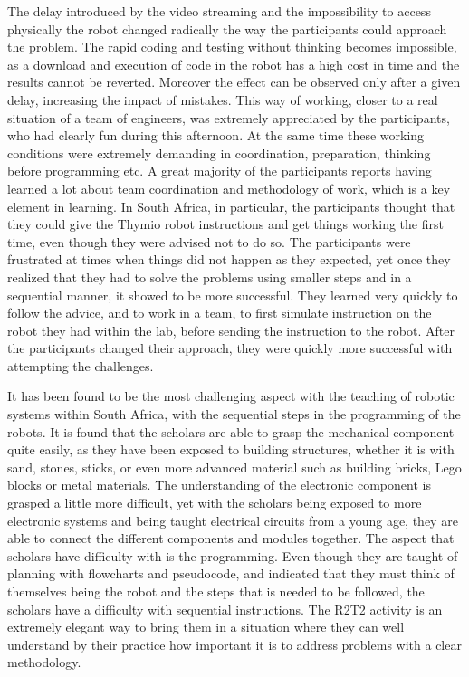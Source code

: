 \documentclass{intech-journal}
\begin{document}
The delay introduced by the video streaming and the impossibility to access physically the robot changed radically the way the participants could approach the problem.
The rapid coding and testing without thinking becomes impossible, as a download and execution of code in the robot has a high cost in time and the results cannot be reverted. 
Moreover the effect can be observed only after a given delay, increasing the impact of mistakes.
This way of working, closer to a real situation of a team of engineers, was extremely appreciated by the participants, who had clearly fun during this afternoon.
At the same time these working conditions were extremely demanding in coordination, preparation, thinking before programming etc. 
A great majority of the participants reports having learned a lot about team coordination and methodology of work, which is a key element in learning.
In South Africa, in particular, the participants thought that they could give the Thymio robot instructions and get things working the first time, even though they were advised not to do so. 
The participants were frustrated at times when things did not happen as they expected, yet once they realized that they had to solve the problems using smaller steps and in a sequential manner, it showed to be more successful. 
They learned very quickly to follow the advice, and to work in a team, to first simulate instruction on the robot they had within the lab, before sending the instruction to the robot.
After the participants changed their approach, they were quickly more successful with attempting the challenges. 

It has been found to be the most challenging aspect with the teaching of robotic systems within South Africa, with the sequential steps in the programming of the robots. 
It is found that the scholars are able to grasp the mechanical component quite easily, as they have been exposed to building structures, whether it is with sand, stones, sticks, or even more advanced material such as building bricks, Lego blocks or metal materials. 
The understanding of the electronic component is grasped a little more difficult, yet with the scholars being exposed to more electronic systems and being taught electrical circuits from a young age, they are able to connect the different components and modules together. 
The aspect that scholars have difficulty with is the programming. 
Even though they are taught of planning with flowcharts and pseudocode, and indicated that they must think of themselves being the robot and the steps that is needed to be followed, the scholars have a difficulty with sequential instructions. 
The R2T2 activity is an extremely elegant way to bring them in a situation where they can well understand by their practice how important it is to address problems with a clear methodology. 
\end{document}

